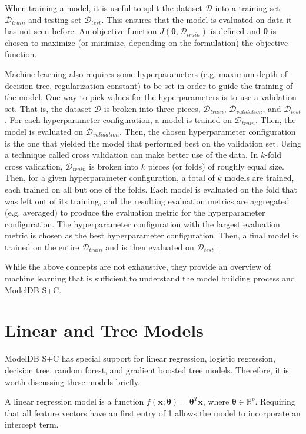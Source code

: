 When training a model, it is useful to split the dataset $\mathcal{D}$ into
a training set $\mathcal{D}_{train}$ and testing set $\mathcal{D}_{test}$. This ensures
that the model is evaluated on data it has not seen before. An objective function
$J(\boldsymbol{\theta}, \mathcal{D}_{train})$ is defined and $\boldsymbol{\theta}$ 
is chosen to maximize (or minimize, depending on the formulation) the objective function.

Machine learning also requires some hyperparameters (e.g. maximum depth of decision tree, regularization constant) 
to be set in order to guide the training of the model. One way to pick values for the hyperparameters
is to use a validation set. That is, the dataset $\mathcal{D}$ is broken into three pieces, 
$\mathcal{D}_{train}$, $\mathcal{D}_{validation}$, and $\mathcal{D}_{test}$. For each 
hyperparameter configuration, a model is trained on $\mathcal{D}_{train}$. Then, the model
is evaluated on $\mathcal{D}_{validation}$. Then, the chosen hyperparameter configuration
is the one that yielded the model that performed best on the validation set. 
Using a technique called cross validation can make better use of the data. In 
$k$-fold cross validation, $\mathcal{D}_{train}$ is broken into $k$ pieces (or folds) of roughly
equal size. Then, for a given hyperparameter configuration, a total of $k$ models are trained, each 
trained on all but one of the folds. Each model is evaluated on the fold that was left out of its training,
and the resulting evaluation metrics are aggregated (e.g. averaged) to produce the evaluation
metric for the hyperparameter configuration. The hyperparameter configuration with the
largest evaluation metric is chosen as the best hyperparameter configuration. Then, a final
model is trained on the entire $\mathcal{D}_{train}$ and is then evaluated on $\mathcal{D}_{test}$ 
\cite{deeplearningbook}.

While the above concepts are not exhaustive, they provide an overview of machine learning that is sufficient to
understand the model building process and ModelDB S+C.

\section{Linear and Tree Models}
ModelDB S+C has special support for linear regression, logistic regression, 
decision tree, random forest, and gradient boosted tree models. Therefore, it is worth discussing
these models briefly.

A linear regression model is a function $f(\textbf{x}; \boldsymbol{\theta}) = \boldsymbol{\theta}^{T}\textbf{x}$,
where $\boldsymbol{\theta} \in \mathbb{R}^{p}$. Requiring that all feature vectors have an first entry of 
1 allows the model to incorporate an intercept term.

